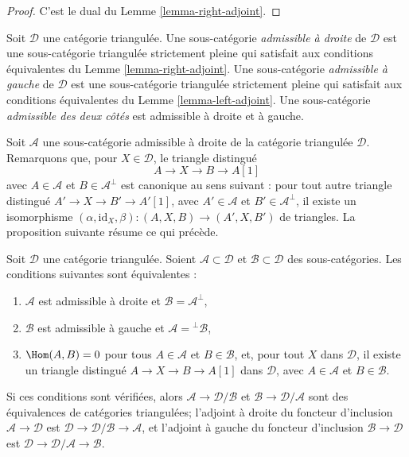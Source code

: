 \begin{proof}
C'est le dual du Lemme \ref{lemma-right-adjoint}.
\end{proof}

\begin{definition}
\label{definition-admissible}
Soit $\mathcal{D}$ une catégorie triangulée. Une sous-catégorie
{\it admissible à droite} de $\mathcal{D}$ est une sous-catégorie triangulée
strictement pleine qui satisfait aux conditions équivalentes du
Lemme \ref{lemma-right-adjoint}.
Une sous-catégorie {\it admissible à gauche} de $\mathcal{D}$ est une
sous-catégorie triangulée strictement pleine qui satisfait aux conditions
équivalentes du Lemme \ref{lemma-left-adjoint}.
Une sous-catégorie {\it admissible des deux côtés} est admissible à droite et
à gauche.
\end{definition}

\noindent
Soit $\mathcal{A}$ une sous-catégorie admissible à droite de la catégorie
triangulée $\mathcal{D}$. Remarquons que, pour $X \in \mathcal{D}$, le
triangle distingué
$$
A \to X \to B \to A[1]
$$
avec $A \in \mathcal{A}$ et $B \in \mathcal{A}^\perp$ est canonique au sens
suivant : pour tout autre triangle distingué
$A' \to X \to B' \to A'[1]$, avec $A' \in \mathcal{A}$ et
$B' \in \mathcal{A}^\perp$, il existe un isomorphisme
$(\alpha, \text{id}_X, \beta) : (A, X, B) \to (A', X, B')$ de triangles.
La proposition suivante résume ce qui précède.

\begin{proposition}
\label{proposition-summarize-admissible}
Soit $\mathcal{D}$ une catégorie triangulée. Soient
$\mathcal{A} \subset \mathcal{D}$ et $\mathcal{B} \subset \mathcal{D}$ des
sous-catégories. Les conditions suivantes sont équivalentes :
\begin{enumerate}
\item $\mathcal{A}$ est admissible à droite et
$\mathcal{B} = \mathcal{A}^\perp$,
\item $\mathcal{B}$ est admissible à gauche et
$\mathcal{A} = {}^\perp\mathcal{B}$,
\item $\Hom(A, B) = 0$ pour tous $A \in \mathcal{A}$ et
$B \in \mathcal{B}$, et, pour tout $X$ dans $\mathcal{D}$, il existe un
triangle distingué $A \to X \to B \to A[1]$ dans $\mathcal{D}$, avec
$A \in \mathcal{A}$ et $B \in \mathcal{B}$.
\end{enumerate}
Si ces conditions sont vérifiées, alors
$\mathcal{A} \to \mathcal{D}/\mathcal{B}$ et
$\mathcal{B} \to \mathcal{D}/\mathcal{A}$ sont des équivalences de catégories
triangulées; l'adjoint à droite du foncteur d'inclusion
$\mathcal{A} \to \mathcal{D}$ est
$\mathcal{D} \to \mathcal{D}/\mathcal{B} \to \mathcal{A}$, et l'adjoint à
gauche du foncteur d'inclusion $\mathcal{B} \to \mathcal{D}$ est
$\mathcal{D} \to \mathcal{D}/\mathcal{A} \to \mathcal{B}$.
\end{proposition}

